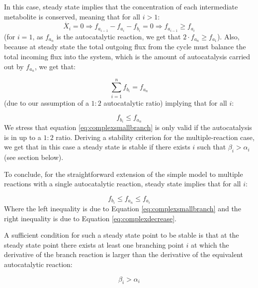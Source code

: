     In this case, steady state implies that the concentration of each intermediate metabolite is conserved, meaning that for all $i>1$:
    \begin{equation}
        \label{eq:complexdecrease}
      \dot{X_i}=0 \Rightarrow f_{a_{i-1}}-f_{a_i}-f_{b_i}=0 \Rightarrow f_{a_{i-1}} \geq f_{a_i}
    \end{equation}
    (for $i=1$, as $f_{a_n}$ is the autocatalytic reaction, we get that $2\cdot f_{a_{n}} \geq f_{a_1}$).
    Also, because at steady state the total outgoing flux from the cycle must balance the total incoming flux into the system, which is the amount of autocatalysis carried out by $f_{a_n}$, we get that:

    \begin{equation*}
      \sum_{i=1}^n f_{b_i}=f_{a_n}
  \end{equation*}
 (due to our assumption of a $1\mathbin{:}2$ autocatalytic ratio) implying that for all $i$:

    \begin{equation}
        \label{eq:complexsmallbranch}
        f_{b_i} \leq f_{a_n}
  \end{equation}
  We stress that equation \ref{eq:complexsmallbranch} is only valid if the autocatalysis is in up to a $1\mathbin{:}2$ ratio.
  Deriving a stability criterion for the multiple-reaction case, we get that in this case a steady state is stable if there exists $i$ such that $\beta_i > \alpha_i$ (see section below).

  To conclude, for the straightforward extension of the simple model to multiple reactions with a single autocatalytic reaction, steady state implies that for all $i$:

    \begin{equation}
        f_{b_i} \leq f_{a_n} \leq f_{a_i}
      \label{eq:complexstst}
    \end{equation}
    Where the left inequality is due to Equation \ref{eq:complexsmallbranch} and the right inequality is due to Equation \ref{eq:complexdecrease}.

    A sufficient condition for such a steady state point to be stable is that at the steady state point there exists at least one branching point $i$ at which the derivative of the branch reaction is larger than the derivative of the equivalent autocatalytic reaction:

    \begin{equation}
      \beta_i > \alpha_i
      \label{eq:complexstab}
    \end{equation}

